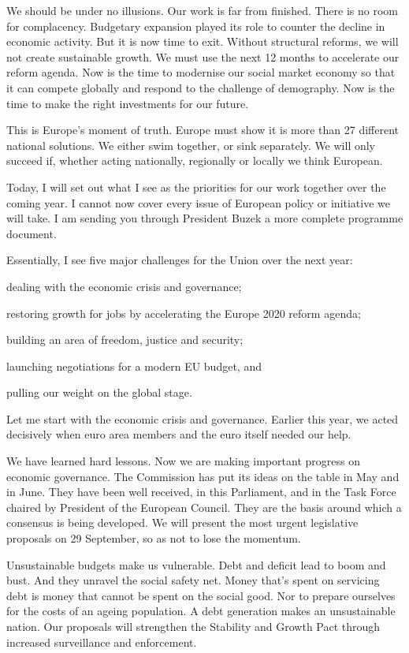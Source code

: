\documentclass[a4paper,11pt]{article}
\begin{document}
We should be under no illusions. Our work is far from finished. There is no room for complacency. Budgetary expansion played its role to counter the decline in economic activity. But it is now time to exit. Without structural reforms, we will not create sustainable growth. We must use the next 12 months to accelerate our reform agenda. Now is the time to modernise our social market economy so that it can compete globally and respond to the challenge of demography. Now is the time to make the right investments for our future.

This is Europe's moment of truth. Europe must show it is more than 27 different national solutions. We either swim together, or sink separately. We will only succeed if, whether acting nationally, regionally or locally we think European.

Today, I will set out what I see as the priorities for our work together over the coming year. I cannot now cover every issue of European policy or initiative we will take. I am sending you through President Buzek a more complete programme document.

Essentially, I see five major challenges for the Union over the next year:

dealing with the economic crisis and governance;

restoring growth for jobs by accelerating the Europe 2020 reform agenda;

building an area of freedom, justice and security;

launching negotiations for a modern EU budget, and

pulling our weight on the global stage.

Let me start with the economic crisis and governance. Earlier this year, we acted decisively when euro area members and the euro itself needed our help.

We have learned hard lessons. Now we are making important progress on economic governance. The Commission has put its ideas on the table in May and in June. They have been well received, in this Parliament, and in the Task Force chaired by President of the European Council. They are the basis around which a consensus is being developed. We will present the most urgent legislative proposals on 29 September, so as not to lose the momentum.

Unsustainable budgets make us vulnerable. Debt and deficit lead to boom and bust. And they unravel the social safety net. Money that's spent on servicing debt is money that cannot be spent on the social good. Nor to prepare ourselves for the costs of an ageing population. A debt generation makes an unsustainable nation. Our proposals will strengthen the Stability and Growth Pact through increased surveillance and enforcement.
\end{document}
